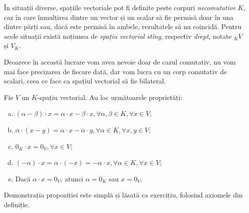 \begin{remark}
În situații diverse, spațiile vectoriale pot fi definite peste corpuri 
\emph{necomutative} $K$, caz în care înmulțirea dintre un vector și un 
scalar să fie permisă doar în una dintre părți sau, dacă este permisă în ambele, 
rezultatele să nu coincidă. Pentru acele situații există noțiunea de 
\emph{spațiu vectorial stîng}, respectiv \emph{drept}, notate $_K V$ și 
$V_K$.

Deoarece în această lucrare vom avea nevoie doar de cazul comutativ, nu vom 
mai face precizarea de fiecare dată, dar vom lucra cu un corp comutativ de 
scalari, ceea ce face ca spațiul vectorial să fie bilateral.
\end{remark}

\begin{proposition}
Fie $V$ un $K$-spațiu vectorial. Au loc următoarele proprietăți:
\begin{enumerate}[(a)]
\item $(\alpha - \beta) \cdot x = \alpha \cdot x - \beta \cdot x, 
\forall \alpha, \beta \in K, \forall x \in V$;
\item $\alpha \cdot (x - y) = \alpha \cdot x - \alpha \cdot y, \forall 
\alpha \in K, \forall x, y \in V$;
\item $0_K \cdot x = 0_V, \forall x \in V$;
\item $(-\alpha) \cdot x = \alpha \cdot (-x) = - \alpha \cdot x, \forall 
\alpha \in K, \forall x \in V$;
\item Dacă $\alpha \cdot x = 0_V$, atunci $\alpha = 0_K$ sau $x = 0_V$.
\end{enumerate}
\end{proposition}

Demonstrația propoziției este simplă și lăsată ca exercițiu, folosind axiomele 
din definiție.

